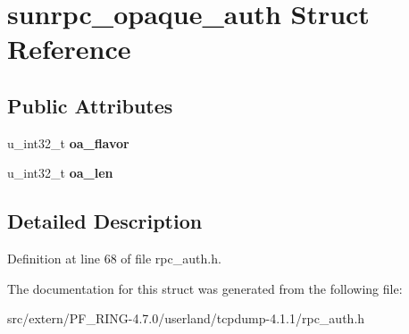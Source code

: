 \hypertarget{structsunrpc__opaque__auth}{
\section{sunrpc\_\-opaque\_\-auth Struct Reference}
\label{structsunrpc__opaque__auth}
}
\subsection*{Public Attributes}
\begin{DoxyCompactItemize}
\item 
\hypertarget{structsunrpc__opaque__auth_a5cb957d6c24669684cc2b5a45596ce7b}{
u\_\-int32\_\-t {\bfseries oa\_\-flavor}}
\label{structsunrpc__opaque__auth_a5cb957d6c24669684cc2b5a45596ce7b}

\item 
\hypertarget{structsunrpc__opaque__auth_a3d1b4227e6a49c5716db2f34589f740d}{
u\_\-int32\_\-t {\bfseries oa\_\-len}}
\label{structsunrpc__opaque__auth_a3d1b4227e6a49c5716db2f34589f740d}

\end{DoxyCompactItemize}


\subsection{Detailed Description}


Definition at line 68 of file rpc\_\-auth.h.



The documentation for this struct was generated from the following file:\begin{DoxyCompactItemize}
\item 
src/extern/PF\_\-RING-\/4.7.0/userland/tcpdump-\/4.1.1/rpc\_\-auth.h\end{DoxyCompactItemize}
